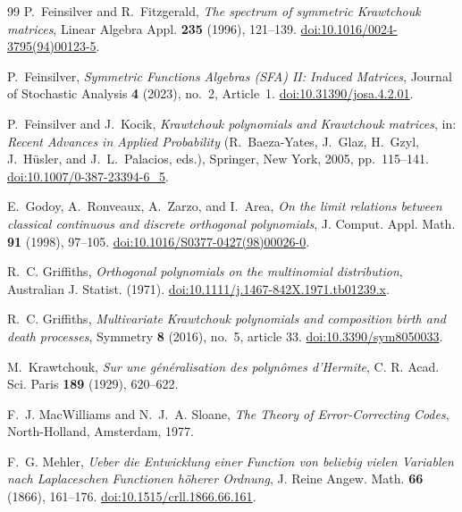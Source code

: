 \documentclass[11pt,reqno]{amsart}
\theoremstyle{definition}
\theoremstyle{remark}
\begin{document}
\begin{thebibliography}{99}
P.~Feinsilver and R.~Fitzgerald, \emph{The spectrum of symmetric
Krawtchouk matrices}, Linear Algebra Appl. \textbf{235} (1996), 121--139.
\href{https://doi.org/10.1016/0024-3795(94)00123-5}{doi:10.1016/0024-3795(94)00123-5}.

P.~Feinsilver, \emph{Symmetric Functions Algebras (SFA) II: Induced
Matrices}, Journal of Stochastic Analysis \textbf{4} (2023), no.~2,
Article~1.
\href{https://doi.org/10.31390/josa.4.2.01}{doi:10.31390/josa.4.2.01}.

P.~Feinsilver and J.~Kocik, \emph{Krawtchouk polynomials and Krawtchouk
matrices}, in: \emph{Recent Advances in Applied Probability}
(R.~Baeza-Yates, J.~Glaz, H.~Gzyl, J.~H\"usler, and J.~L.~Palacios, eds.),
Springer, New York, 2005, pp.~115--141.
\href{https://doi.org/10.1007/0-387-23394-6_5}{doi:10.1007/0-387-23394-6\_5}.

E.~Godoy, A.~Ronveaux, A.~Zarzo, and I.~Area, \emph{On the limit
relations between classical continuous and discrete orthogonal
polynomials}, J. Comput. Appl. Math. \textbf{91} (1998), 97--105.
\href{https://doi.org/10.1016/S0377-0427(98)00026-0}{doi:10.1016/S0377-0427(98)00026-0}.

R.~C. Griffiths, \emph{Orthogonal polynomials on the multinomial distribution},
Australian J. Statist. (1971).
\href{https://doi.org/10.1111/j.1467-842X.1971.tb01239.x}{doi:10.1111/j.1467-842X.1971.tb01239.x}.

R.~C. Griffiths, \emph{Multivariate Krawtchouk polynomials and composition
birth and death processes}, Symmetry \textbf{8} (2016), no.~5, article 33.
\href{https://doi.org/10.3390/sym8050033}{doi:10.3390/sym8050033}.

M.~Krawtchouk, \emph{Sur une g\'en\'eralisation des polyn\^omes
d'Hermite}, C. R. Acad. Sci. Paris \textbf{189} (1929), 620--622.

F.~J. MacWilliams and N.~J.~A. Sloane, \emph{The Theory of
Error-Correcting Codes}, North-Holland, Amsterdam, 1977.

F.~G. Mehler, \emph{Ueber die Entwicklung einer Function von beliebig
vielen Variablen nach Laplaceschen Functionen h\"oherer Ordnung},
J. Reine Angew. Math. \textbf{66} (1866), 161--176.
\href{https://doi.org/10.1515/crll.1866.66.161}{doi:10.1515/crll.1866.66.161}.
\end{thebibliography}
\end{document}
